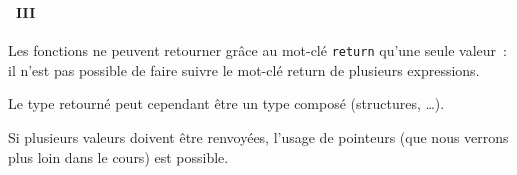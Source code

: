 \begin{frame}[containsverbatim]
  \frametitle{\secname}
  \framesubtitle{\subsecname~III}
  
  Les fonctions ne peuvent retourner grâce au mot-clé \verb|return| qu'une seule valeur~: il n'est pas possible de faire suivre le mot-clé return de plusieurs expressions.
  \vspace{0.5cm}
  \par
  Le type retourné peut cependant être un type composé (structures, \ldots).
  \vspace{0.5cm}
  \par
  Si plusieurs valeurs doivent être renvoyées, l'usage de pointeurs (que nous verrons plus loin dans le cours) est possible.
\end{frame}

